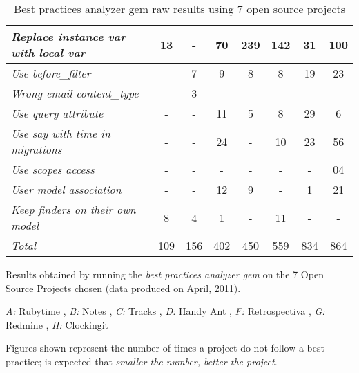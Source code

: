 \begin{table}[H]
\begin{center}
{\begin{threeparttable}
\begin{tabular}{|l||c|c|c|c|c|c|c|}
  \emph{Replace instance var with local var   }              &  13  &   -  &  70  & 239 & 142 &  31 & 100  \\ \hline
  \emph{Use before\_filter                    }              &   -  &   7  &   9  &   8 &   8 &  19 &  23  \\ \hline
  \emph{Wrong email content\_type             }              &   -  &   3  &   -  &   - &   - &   - &   -  \\ \hline
  \emph{Use query attribute                   }              &   -  &   -  &  11  &   5 &   8 &  29 &   6  \\ \hline
  \emph{Use say with time in migrations       }              &   -  &   -  &  24  &   - &  10 &  23 &  56  \\ \hline
  \emph{Use scopes access                     }              &   -  &   -  &   -  &   - &   - &   - &  04  \\ \hline
  \emph{User model association                }              &   -  &   -  &  12  &   9 &   - &   1 &  21  \\ \hline
  \emph{Keep finders on their own model       }              &   8  &   4  &   1  &   - &  11 &   - &   -  \\ \hline
  \emph{Total                                 }              & 109  & 156  & 402  & 450 & 559 & 834 & 864  \\ \hline
  \end{tabular}
  \begin{tablenotes}
	\item Results obtained by running the \emph{best practices analyzer gem} on the 7 Open Source Projects chosen 
	      (data produced on April, 2011).
    \item \emph{A:} Rubytime
    , \emph{B:} Notes
    , \emph{C:} Tracks
    , \emph{D:} Handy Ant
    , \emph{F:} Retrospectiva
    , \emph{G:} Redmine
    , \emph{H:} Clockingit
    \item Figures shown represent the number of times a project do not follow a best practice; is expected that \emph{smaller the number, better the project}.
  \end{tablenotes}
  \end{threeparttable}
}
\end{center}
\caption{Best practices analyzer gem raw results using 7 open source projects}
\end{table}